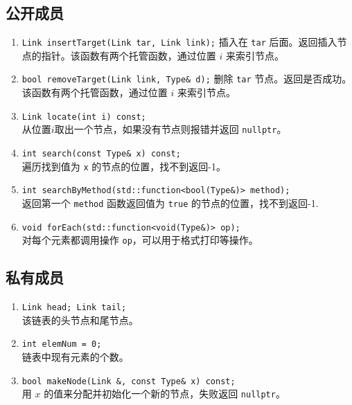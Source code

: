 {
\subsection{公开成员}
\begin{enumerate}
    \item \lstinline{Link insertTarget(Link tar, Link link);}
          插入在 \lstinline{tar} 后面。返回插入节点的指针。该函数有两个托管函数，通过位置 $i$ 来索引节点。
    \item \lstinline{bool removeTarget(Link link, Type& d);}
          删除 \lstinline{tar} 节点。返回是否成功。该函数有两个托管函数，通过位置 $i$ 来索引节点。
    \item \lstinline{Link locate(int i) const;} \\
          从位置$i$取出一个节点，如果没有节点则报错并返回 \lstinline{nullptr}。
    \item \lstinline{int search(const Type& x) const;} \\
          遍历找到值为 \lstinline{x} 的节点的位置，找不到返回-1。
    \item \lstinline{int searchByMethod(std::function<bool(Type&)> method);} \\
          返回第一个 \lstinline{method} 函数返回值为 \lstinline{true} 的节点的位置，找不到返回-1.
    \item \lstinline{void forEach(std::function<void(Type&)> op);} \\
          对每个元素都调用操作 \lstinline{op}，可以用于格式打印等操作。
\end{enumerate}

\subsection{私有成员}
\begin{enumerate}
    \item \lstinline{Link head; Link tail;} \\
          该链表的头节点和尾节点。
    \item \lstinline{int elemNum = 0;} \\
          链表中现有元素的个数。
    \item \lstinline{bool makeNode(Link &, const Type& x) const;} \\
          用 $x$ 的值来分配并初始化一个新的节点，失败返回 \lstinline{nullptr}。
\end{enumerate}
}

